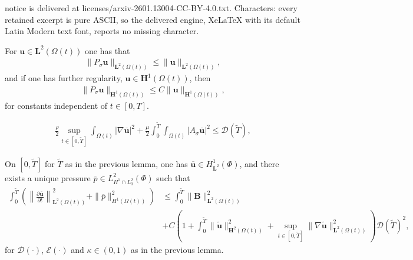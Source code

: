 \documentclass[10pt,a4paper]{amsart}
\newcommand{\ddt}[1]{\frac{\partial #1}{\partial t}}
\newcommand{\grad}{\nabla}
\newcommand{\mbf}[1]{\mathbf{#1}}
\begin{document}
notice is delivered at licenses/arxiv-2601.13004-CC-BY-4.0.txt. Characters: every retained excerpt is pure ASCII, so the delivered engine, XeLaTeX with its default Latin Modern text font, reports no missing character.
\begin{lemma}  
    For $\mbf{u} \in \mbf{L}^2(\Omega(t))$ one has that
    \begin{align}
        \|P_\sigma \mbf{u}\|_{\mbf{L}^2(\Omega(t))} \leq \|\mbf{u}\|_{\mbf{L}^2(\Omega(t))}, \label{eqn: leray L2 bound}
    \end{align}
    and if one has further regularity, $\mbf{u} \in \mbf{H}^1(\Omega(t))$, then
    \begin{align}
        \|P_\sigma \mbf{u}\|_{\mbf{H}^1(\Omega(t))} \leq C\|\mbf{u}\|_{\mbf{H}^1(\Omega(t))}, \label{eqn: leray H1 bound}
    \end{align}
    for constants independent of $t \in [0,T]$.
\end{lemma}

	\begin{align}
		\frac{\rho}{2} \sup_{t \in [0,\widetilde{T}]} \int_{\Omega(t)} |\grad \overline{\mbf{u}}|^2 + \frac{\mu}{2} \int_0^{\widetilde{T}}\int_{\Omega(t)} |A_{\sigma} \overline{\mbf{u}}|^2 \leq  \mathcal{D}(\widetilde{T}), \label{fsi energyestimate2}
	\end{align}

\begin{lemma}
\label{lemma: fsi energy estimates2}
	On $[0,\widetilde{T}]$ for $\widetilde{T}$ as in the previous lemma, one has $\overline{\mbf{u}} \in H^1_{\mbf{L}^2}(\Phi)$, and there exists a unique pressure $\overline{p} \in L^2_{H^1 \cap L^2_0}(\Phi)$ such that
	\begin{equation}
        \begin{aligned}
		\int_{0}^{\widetilde{T}} \left(\left\| \ddt{\overline{\mbf{u}}} \right\|_{\mbf{L}^2(\Omega(t))}^2 + \|\overline{p}\|_{H^1(\Omega(t))}^2\right) &\leq \int_0^{\widetilde{T}} \|\mbf{B}\|_{\mbf{L}^2(\Omega(t))}^2\\
        &+C\left(1 + \int_0^{\widetilde{T}} \|\widetilde{\mbf{u}}\|_{\mbf{H}^2(\Omega(t))}^2 +  \sup_{t \in [0,\widetilde{T}]} \|\grad \widetilde{\mbf{u}}\|_{\mbf{L}^2(\Omega(t))}^2\right) \mathcal{D}(\widetilde{T})^2,
        \end{aligned}
        \label{fsi energyestimate3}
	\end{equation}
	for $\mathcal{D}(\cdot)$, $\mathcal{E}(\cdot)$ and $\kappa \in (0,1)$ as in the previous lemma.
\end{lemma}
\end{document}
